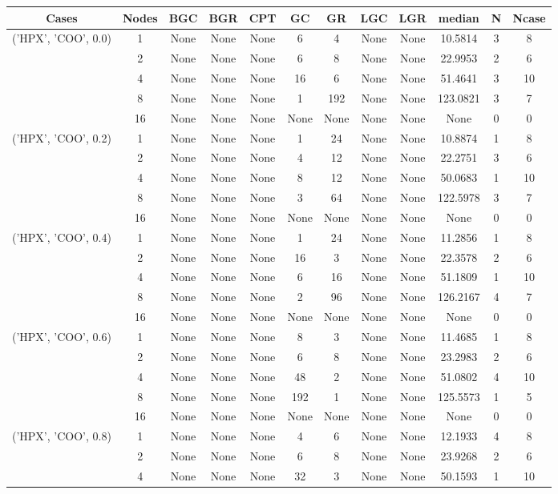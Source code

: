 \begin{tabular}{cccccccccccc}
\hline
Cases & Nodes& BGC& BGR& CPT& GC& GR& LGC& LGR& median & N & Ncase \\
\hline
\multirow{5}{*}{('HPX', 'COO', 0.0)}& 1& None& None& None& 6& 4& None& None& 10.5814& 3& 8\\
& 2& None& None& None& 6& 8& None& None& 22.9953& 2& 6\\
& 4& None& None& None& 16& 6& None& None& 51.4641& 3& 10\\
& 8& None& None& None& 1& 192& None& None& 123.0821& 3& 7\\
& 16& None& None& None& None& None& None& None& None& 0& 0\\
\hline
\multirow{5}{*}{('HPX', 'COO', 0.2)}& 1& None& None& None& 1& 24& None& None& 10.8874& 1& 8\\
& 2& None& None& None& 4& 12& None& None& 22.2751& 3& 6\\
& 4& None& None& None& 8& 12& None& None& 50.0683& 1& 10\\
& 8& None& None& None& 3& 64& None& None& 122.5978& 3& 7\\
& 16& None& None& None& None& None& None& None& None& 0& 0\\
\hline
\multirow{5}{*}{('HPX', 'COO', 0.4)}& 1& None& None& None& 1& 24& None& None& 11.2856& 1& 8\\
& 2& None& None& None& 16& 3& None& None& 22.3578& 2& 6\\
& 4& None& None& None& 6& 16& None& None& 51.1809& 1& 10\\
& 8& None& None& None& 2& 96& None& None& 126.2167& 4& 7\\
& 16& None& None& None& None& None& None& None& None& 0& 0\\
\hline
\multirow{5}{*}{('HPX', 'COO', 0.6)}& 1& None& None& None& 8& 3& None& None& 11.4685& 1& 8\\
& 2& None& None& None& 6& 8& None& None& 23.2983& 2& 6\\
& 4& None& None& None& 48& 2& None& None& 51.0802& 4& 10\\
& 8& None& None& None& 192& 1& None& None& 125.5573& 1& 5\\
& 16& None& None& None& None& None& None& None& None& 0& 0\\
\hline
\multirow{5}{*}{('HPX', 'COO', 0.8)}& 1& None& None& None& 4& 6& None& None& 12.1933& 4& 8\\
& 2& None& None& None& 6& 8& None& None& 23.9268& 2& 6\\
& 4& None& None& None& 32& 3& None& None& 50.1593& 1& 10\\

\end{tabular}
